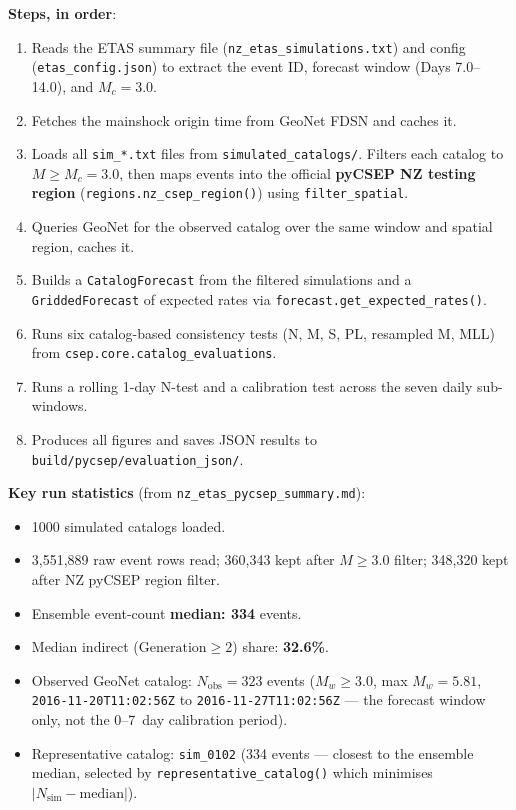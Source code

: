 \documentclass[12pt,a4paper]{article}
\begin{document}
\textbf{Steps, in order}:
\begin{enumerate}
    \item Reads the ETAS summary file (\texttt{nz\_etas\_simulations.txt}) and
          config (\texttt{etas\_config.json}) to extract the event ID, forecast
          window (Days 7.0--14.0), and $M_c = 3.0$.
    \item Fetches the mainshock origin time from GeoNet FDSN and caches it.
    \item Loads all \texttt{sim\_*.txt} files from \texttt{simulated\_catalogs/}.
          Filters each catalog to $M \geq M_c = 3.0$, then maps events into
          the official
\newline \textbf{pyCSEP NZ testing region}
          (\texttt{regions.nz\_csep\_region()}) using \texttt{filter\_spatial}.
    \item Queries GeoNet for the observed catalog over the same window and
          spatial region, caches it.
    \item Builds a \texttt{CatalogForecast} from the filtered simulations and
          a \texttt{GriddedForecast} of expected rates via
          \texttt{forecast.get\_expected\_rates()}.
    \item Runs six catalog-based consistency tests (N, M, S, PL, resampled M,
          MLL) from \texttt{csep.core.catalog\_evaluations}.
    \item Runs a rolling 1-day N-test and a calibration test across the seven
          daily sub-windows.
    \item Produces all figures and saves JSON results to
          \texttt{build/pycsep/evaluation\_json/}.
\end{enumerate}

\textbf{Key run statistics} (from \texttt{nz\_etas\_pycsep\_summary.md}):
\begin{itemize}
    \item 1000 simulated catalogs loaded.
    \item 3{,}551{,}889 raw event rows read; 360{,}343 kept after $M \geq 3.0$
          filter; 348{,}320 kept after NZ pyCSEP region filter.
    \item Ensemble event-count \textbf{median: 334} events.
    \item Median indirect ($\text{Generation} \geq 2$) share: \textbf{32.6\%}.
    \item Observed GeoNet catalog: \textbf{$N_\text{obs} = 323$} events
          ($M_w \geq 3.0$, max $M_w = 5.81$,
          \texttt{2016-11-20T11:02:56Z} to \texttt{2016-11-27T11:02:56Z} ---
          the forecast window only, not the 0--7~day calibration period).
    \item Representative catalog: \texttt{sim\_0102} (334 events --- closest
          to the ensemble median, selected by
          \texttt{representative\_catalog()} which minimises
          $|N_\text{sim} - \text{median}|$).
\end{itemize}
\end{document}
